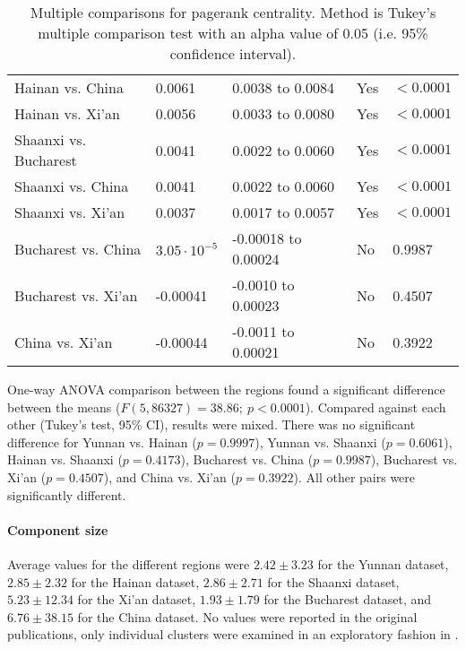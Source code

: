 \begin{table}[h]
\begin{mdframed}
\begin{tabular*}{\linewidth}{l|llll}
			Hainan vs. China & 0.0061 & 0.0038 to 0.0084 & Yes & $<0.0001$\\
			Hainan vs. Xi'an & 0.0056 & 0.0033 to 0.0080 & Yes & $<0.0001$\\
			Shaanxi vs. Bucharest & 0.0041 & 0.0022 to 0.0060 & Yes & $<0.0001$\\
			Shaanxi vs. China & 0.0041 & 0.0022 to 0.0060 & Yes & $<0.0001$\\
			Shaanxi vs. Xi'an & 0.0037 &0.0017 to 0.0057 & Yes & $<0.0001$\\
			Bucharest vs. China & $3.05\cdot 10^{-5}$ & -0.00018 to 0.00024 & No & 0.9987\\
			Bucharest vs. Xi'an & -0.00041 & -0.0010 to 0.00023 & No & 0.4507\\
			China vs. Xi'an & -0.00044 & -0.0011 to 0.00021 & No & 0.3922\\
			\hline
		\end{tabular*}
		\caption{Multiple comparisons for pagerank centrality. Method is Tukey's multiple comparison test with an alpha value of 0.05 (i.e. 95\% confidence interval).}
		\label{tab:pagerank_centrality_tukey}
	\end{mdframed}
\end{table}

One-way ANOVA comparison between the regions found a significant difference between the means ($F(5,86327) = 38.86; \: p<0.0001$). Compared against each other (Tukey's test, 95\% CI), results were mixed. There was no significant difference for Yunnan vs. Hainan ($p=0.9997$), Yunnan vs. Shaanxi ($p=0.6061$), Hainan vs. Shaanxi ($p=0.4173$), Bucharest vs. China ($p=0.9987$), Bucharest vs. Xi'an ($p=0.4507$), and China vs. Xi'an ($p=0.3922$). All other pairs were significantly different.

\paragraph{Component size} Average values for the different regions were $2.42\pm3.23$ for the Yunnan dataset, $2.85\pm2.32$ for the Hainan dataset, $2.86\pm2.71$ for the Shaanxi dataset, $5.23\pm12.34$ for the Xi'an dataset, $1.93\pm1.79$ for the Bucharest dataset, and $6.76\pm38.15$ for the China dataset. No values were reported in the original publications, only individual clusters were examined in an exploratory fashion in \cite{hainan_publication,shaanxi_publication,xian_publication}.

